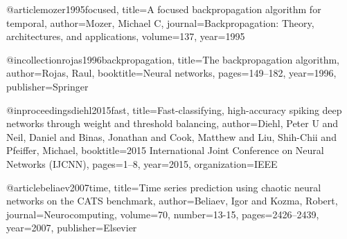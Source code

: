 @article{mozer1995focused,
  title={A focused backpropagation algorithm for temporal},
  author={Mozer, Michael C},
  journal={Backpropagation: Theory, architectures, and applications},
  volume={137},
  year={1995}
}

@incollection{rojas1996backpropagation,
  title={The backpropagation algorithm},
  author={Rojas, Raul},
  booktitle={Neural networks},
  pages={149--182},
  year={1996},
  publisher={Springer}
}

@inproceedings{diehl2015fast,
  title={Fast-classifying, high-accuracy spiking deep networks through weight and threshold balancing},
  author={Diehl, Peter U and Neil, Daniel and Binas, Jonathan and Cook, Matthew and Liu, Shih-Chii and Pfeiffer, Michael},
  booktitle={2015 International Joint Conference on Neural Networks (IJCNN)},
  pages={1--8},
  year={2015},
  organization={IEEE}
}

@article{beliaev2007time,
  title={Time series prediction using chaotic neural networks on the CATS benchmark},
  author={Beliaev, Igor and Kozma, Robert},
  journal={Neurocomputing},
  volume={70},
  number={13-15},
  pages={2426--2439},
  year={2007},
  publisher={Elsevier}
}

